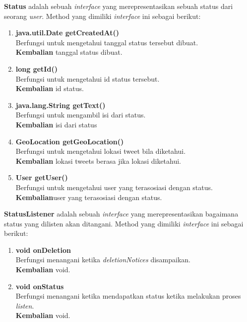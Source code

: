 \textbf{Status} adalah sebuah \textit{interface} yang merepresentasikan sebuah status dari seorang \textit{user}. Method yang dimiliki \textit{interface} ini sebagai berikut:
\begin{enumerate}
	\item \textbf{java.util.Date getCreatedAt()}\\
	Berfungsi untuk mengetahui tanggal status tersebut dibuat.\\
	\textbf{Kembalian} tanggal status dibuat.
	\item \textbf{long getId()}\\
	Berfungsi untuk mengetahui id status tersebut.\\
	\textbf{Kembalian} id status.
	\item \textbf{java.lang.String getText()}\\
	Berfungsi untuk mengambil isi dari status.\\
	\textbf{Kembalian} isi dari status
	\item \textbf{GeoLocation getGeoLocation()}\\
	Berfungsi untuk mengetahui lokasi tweet bila diketahui.\\
	\textbf{Kembalian} lokasi tweets berasa jika lokasi diketahui.
	\item \textbf{User getUser()}\\
	Berfungsi untuk mengetahui user yang terasosiasi dengan status.\\
	\textbf{Kembalian}user yang terasosiasi dengan status.
\end{enumerate}
\textbf{StatusListener} adalah sebuah \textit{interface} yang merepresentasikan bagaimana status yang dilisten akan ditangani. Method yang dimiliki \textit{interface} ini sebagai berikut:
\begin{enumerate}
	\item \textbf{void onDeletion}\\
	Berfungsi menangani ketika \textit{deletionNotices} disampaikan.\\
	\textbf{Kembalian} void.
	\item \textbf{void onStatus}\\
	Berfungsi menangani ketika mendapatkan status ketika melakukan proses \textit{listen}.\\
	\textbf{Kembalian} void.
\end{enumerate}
